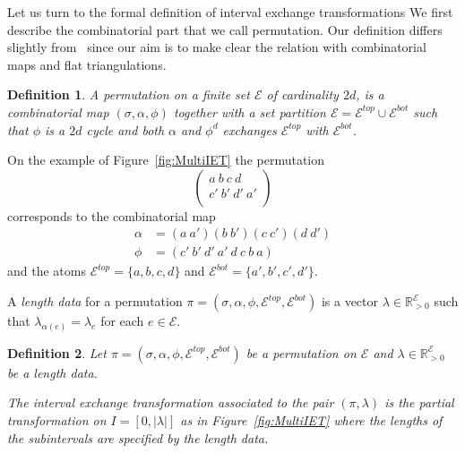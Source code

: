 \documentclass[a4paper,12pt]{article}
\def\RR{\mathbb{R}}
\def\cA{\mathcal{A}}
\def\cE{\mathcal{E}}
\newtheorem{definition}{Definition}
\newtheorem{remark}[definition]{Remark}
\begin{document}
Let us turn to the formal definition of interval exchange transformations
We first describe the combinatorial part that we call permutation. Our definition
differs slightly from~\cite{Yoccoz} since our aim is to make clear the relation
with combinatorial maps and flat triangulations.
\begin{definition}
A \emph{permutation} on a finite set $\cE$ of cardinality $2d$, is a combinatorial
map $(\sigma, \alpha, \phi)$ together with a set partition $\cE = \cE^{top} \cup \cE^{bot}$
such that $\phi$ is a $2d$ cycle and both $\alpha$ and $\phi^d$ exchanges
$\cE^{top}$ with $\cE^{bot}$.
\end{definition}
On the example of Figure~\ref{fig:MultiIET} the permutation
\[
\left(\begin{array}{c}
a\ b\ c\ d \\
c'\ b'\ d'\ a' \\
\end{array} \right)
\]
corresponds to the combinatorial map
\begin{align*}
\alpha &= (a\ a')(b\ b')(c\ c')(d\ d') \\
\phi &= (c'\ b'\ d'\ a'\ d\ c\ b\ a)
\end{align*}
and the atoms $\cE^{top} = \{a,b,c,d\}$ and $\cE^{bot} = \{a',b',c',d'\}$.

A \emph{length data} for a permutation $\pi = (\sigma, \alpha, \phi, \cE^{top}, \cE^{bot})$
is a vector $\lambda \in \RR_{>0}^\cE$ such that $\lambda_{\alpha(e)} = \lambda_e$ for each
$e \in \cE$.

\begin{definition}
Let $\pi = (\sigma, \alpha, \phi, \cE^{top}, \cE^{bot})$ be a permutation
on $\cE$ and $\lambda \in \RR_{>0}^\cE$ be a length data.

The \emph{interval exchange transformation} associated to the pair $(\pi,\lambda)$
is the partial transformation on $I = [0, |\lambda|]$
as in Figure~\ref{fig:MultiIET} where the lengths of the subintervals are specified
by the length data.
\end{definition}

\end{document}
